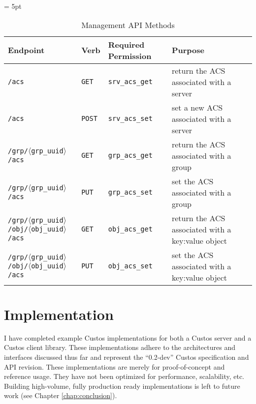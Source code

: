 \begin{table}[!tbh]
  \vspace{1ex}
  \begin{center}
    \tabulinesep = 5pt
    \begin{tabu} to \textwidth
      { | X[2.5,l,m]
        | X[.5,l,m]
        | X[1,l,m]
        | X[1,l,m]
        | }
      \hline
      \textbf{Endpoint}
      & \textbf{Verb}
      & \textbf{Required Permission}
      & \textbf{Purpose}
      \\ \hline
      \texttt{/acs}
      & \texttt{GET} & \texttt{srv\_acs\_get}
      & return the ACS associated with a server
      \\ \hline
      \texttt{/acs}
      & \texttt{POST} & \texttt{srv\_acs\_set}
      & set a new ACS associated with a server
      \\ \hline
      \texttt{/grp/$\langle$grp\_uuid$\rangle$/acs}
      & \texttt{GET} & \texttt{grp\_acs\_get}
      & return the ACS associated with a group
      \\ \hline
      \texttt{/grp/$\langle$grp\_uuid$\rangle$/acs}
      & \texttt{PUT} & \texttt{grp\_acs\_set}
      & set the ACS associated with a group
      \\ \hline
      \texttt{/grp/$\langle$grp\_uuid$\rangle$/obj/$\langle$obj\_uuid$\rangle$/acs}
      & \texttt{GET} & \texttt{obj\_acs\_get}
      & return the ACS associated with a key:value object
      \\ \hline
      \texttt{/grp/$\langle$grp\_uuid$\rangle$/obj/$\langle$obj\_uuid$\rangle$/acs}
      & \texttt{PUT} & \texttt{obj\_acs\_set}
      & set the ACS associated with a key:value object
      \\ \hline
    \end{tabu}
  \end{center}
  \caption{Management API Methods}
  \label{tab:methods-mgmt}
\end{table}

\section{Implementation}

I have completed example Custos implementations for both a Custos
server and a Custos client library. These implementations adhere to
the architectures and interfaces discussed thus far and represent the
``0.2-dev'' Custos specification and API revision. These
implementations are merely for proof-of-concept and reference
usage. They have not been optimized for performance, scalability,
etc. Building high-volume, fully production ready implementations is
left to future work (see Chapter \ref{chap:conclusion}).

